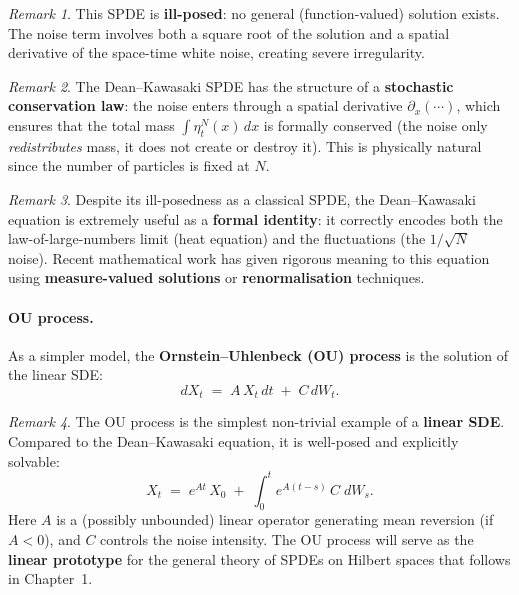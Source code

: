 \documentclass[11pt]{article}
\theoremstyle{definition}
\theoremstyle{remark}
\newtheorem{remark}{Remark}
\begin{document}
\begin{remark}
This SPDE is \textbf{ill-posed}: no general (function-valued) solution exists.
The noise term involves both a square root of the solution and a spatial
derivative of the space-time white noise, creating severe irregularity.
\end{remark}

\begin{remark}
The Dean--Kawasaki SPDE has the structure of a
\textbf{stochastic conservation law}: the noise enters through
a spatial derivative $\partial_x(\cdots)$, which ensures that
the total mass $\int \eta_t^N(x)\,dx$ is formally conserved
(the noise only \emph{redistributes} mass, it does not create
or destroy it).  This is physically natural since the number
of particles is fixed at $N$.
\end{remark}

\begin{remark}
Despite its ill-posedness as a classical SPDE, the Dean--Kawasaki
equation is extremely useful as a \textbf{formal identity}: it
correctly encodes both the law-of-large-numbers limit
(heat equation) and the fluctuations (the $1/\sqrt{N}$ noise).
Recent mathematical work has given rigorous meaning to this
equation using \textbf{measure-valued solutions} or
\textbf{renormalisation} techniques.
\end{remark}

\paragraph{OU process.}


As a simpler model, the \textbf{Ornstein--Uhlenbeck (OU) process}
is the solution of the linear SDE:
\[
    dX_t \;=\; A\,X_t\,dt \;+\; C\,dW_t.
\]

\begin{remark}
The OU process is the simplest non-trivial example of a
\textbf{linear SDE}.  Compared to the Dean--Kawasaki equation,
it is well-posed and explicitly solvable:
\[
    X_t \;=\; e^{At}\,X_0
    \;+\;\int_0^t e^{A(t-s)}\,C\;dW_s.
\]
Here $A$ is a (possibly unbounded) linear operator generating
mean reversion (if $A < 0$), and $C$ controls the noise intensity.
The OU process will serve as the \textbf{linear prototype}
for the general theory of SPDEs on Hilbert spaces that follows
in Chapter~1.
\end{remark}
\end{document}
